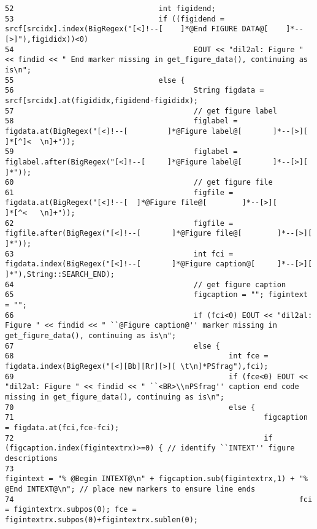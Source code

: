 \begin{verbatim}
52                                 int figidend;
53                                 if ((figidend = srcf[srcidx].index(BigRegex("[<]!--[    ]*@End FIGURE DATA@[    ]*--[>]"),figididx))<0)
54                                         EOUT << "dil2al: Figure " << findid << " End marker missing in get_figure_data(), continuing as is\n";
55                                 else {
56                                         String figdata = srcf[srcidx].at(figididx,figidend-figididx);
57                                         // get figure label
58                                         figlabel = figdata.at(BigRegex("[<]!--[         ]*@Figure label@[       ]*--[>][        ]*[^]<  \n]+"));
59                                         figlabel = figlabel.after(BigRegex("[<]!--[     ]*@Figure label@[       ]*--[>][        ]*"));
60                                         // get figure file
61                                         figfile = figdata.at(BigRegex("[<]!--[  ]*@Figure file@[        ]*--[>][        ]*[^<   \n]+"));
62                                         figfile = figfile.after(BigRegex("[<]!--[       ]*@Figure file@[        ]*--[>][        ]*"));
63                                         int fci = figdata.index(BigRegex("[<]!--[       ]*@Figure caption@[     ]*--[>][        ]*"),String::SEARCH_END);
64                                         // get figure caption
65                                         figcaption = ""; figintext = "";
66                                         if (fci<0) EOUT << "dil2al: Figure " << findid << " ``@Figure caption@'' marker missing in get_figure_data(), continuing as is\n";
67                                         else {
68                                                 int fce = figdata.index(BigRegex("[<][Bb][Rr][>][ \t\n]*PSfrag"),fci);
69                                                 if (fce<0) EOUT << "dil2al: Figure " << findid << " ``<BR>\\nPSfrag'' caption end code missing in get_figure_data(), continuing as is\n";
70                                                 else {
71                                                         figcaption = figdata.at(fci,fce-fci);
72                                                         if (figcaption.index(figintextrx)>=0) { // identify ``INTEXT'' figure descriptions
73                                                                 figintext = "% @Begin INTEXT@\n" + figcaption.sub(figintextrx,1) + "% @End INTEXT@\n"; // place new markers to ensure line ends
74                                                                 fci = figintextrx.subpos(0); fce = figintextrx.subpos(0)+figintextrx.sublen(0);

\end{verbatim}
